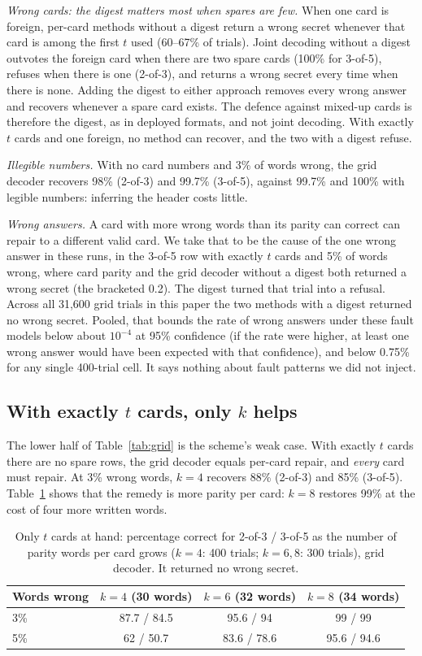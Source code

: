\documentclass[numeric]{anvil-paper}
\begin{document}
\emph{Wrong cards: the digest matters most when spares are few.} When one
card is foreign, per-card methods without a digest return a wrong secret
whenever that card is among the first $t$ used (60--67\% of trials). Joint
decoding without a digest outvotes the foreign card when there are two spare
cards (100\% for 3-of-5), refuses when there is one (2-of-3), and returns a
wrong secret every time when there is none. Adding the digest to either
approach removes every wrong answer and recovers whenever a spare card
exists. The defence against mixed-up cards is therefore the digest, as in
deployed formats, and not joint decoding. With exactly $t$ cards and one
foreign, no method can recover, and the two with a digest refuse.

\emph{Illegible numbers.} With no card numbers and 3\% of words wrong, the grid
decoder recovers 98\% (2-of-3) and 99.7\% (3-of-5), against 99.7\% and
100\% with legible numbers: inferring the header costs little.

\emph{Wrong answers.} A card with more wrong words than its parity can
correct can repair to a different valid card. We take that to be the cause of
the one wrong answer in these runs,
in the 3-of-5 row with exactly $t$ cards and 5\% of words wrong, where card
parity and the grid decoder without a digest both returned a wrong secret
(the bracketed 0.2). The digest
turned that trial into a refusal. Across all 31{,}600 grid trials in this paper the two
methods with a digest returned no wrong secret. Pooled, that bounds the rate of
wrong answers under these fault models below about $10^{-4}$ at 95\% confidence
(if the rate were higher, at least one wrong answer would have been
expected with that confidence), and below 0.75\% for any single 400-trial cell. It says
nothing about fault patterns we did not inject.

\subsection{With exactly $t$ cards, only $k$ helps}

The lower half of Table~\ref{tab:grid} is the scheme's weak case. With exactly
$t$ cards there are no spare rows, the grid decoder equals per-card repair, and
\emph{every} card must repair. At 3\% wrong words, $k=4$ recovers 88\% (2-of-3)
and 85\% (3-of-5). Table~\ref{tab:k} shows that the remedy is more parity per
card: $k=8$ restores 99\% at the cost of four more written words.

\begin{table}[!htb]
\centering
\caption{Only $t$ cards at hand: percentage correct for 2-of-3 / 3-of-5 as the
number of parity words per card grows ($k=4$: 400 trials; $k=6,8$: 300
trials), grid decoder. It returned no wrong secret.}
\label{tab:k}
\small
\begin{tabular}{lccc}
\toprule
Words wrong & $k=4$ (30 words) & $k=6$ (32 words) & $k=8$ (34 words) \\
\midrule
3\% & 87.7 / 84.5 & 95.6 / 94 & 99 / 99 \\
5\% & 62 / 50.7 & 83.6 / 78.6 & 95.6 / 94.6 \\
\bottomrule
\end{tabular}
\end{table}
\end{document}
